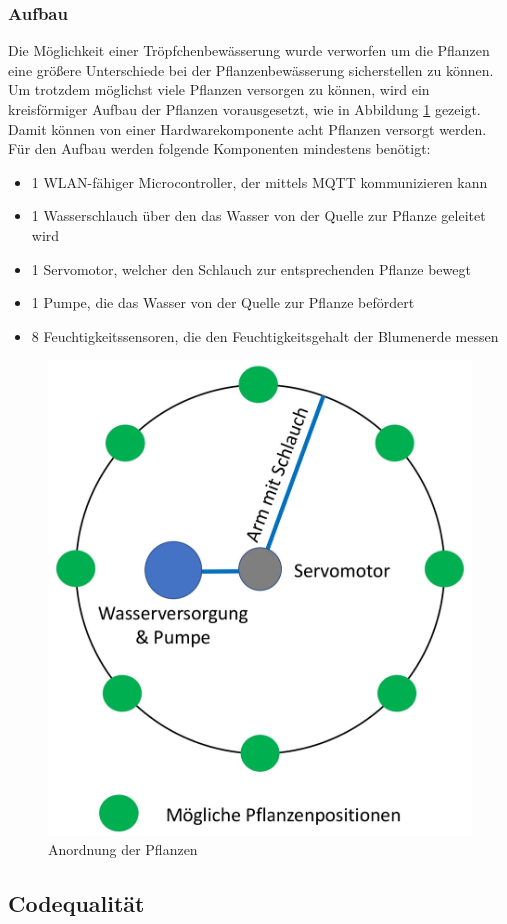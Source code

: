         \subsubsection{Aufbau}
        Die Möglichkeit einer Tröpfchenbewässerung wurde verworfen um die Pflanzen eine größere Unterschiede bei der Pflanzenbewässerung sicherstellen zu können. Um trotzdem möglichst viele Pflanzen versorgen zu können, wird ein kreisförmiger Aufbau der Pflanzen vorausgesetzt, wie in Abbildung \ref{fig:position} gezeigt. Damit können von einer Hardwarekomponente acht Pflanzen versorgt werden. \\
        
        Für den Aufbau werden folgende Komponenten mindestens benötigt:
        \begin{itemize}
            \item 1 WLAN-fähiger Microcontroller, der mittels MQTT kommunizieren kann
            \item 1 Wasserschlauch über den das Wasser von der Quelle zur Pflanze geleitet wird
            \item 1 Servomotor, welcher den Schlauch zur entsprechenden Pflanze bewegt
            \item 1 Pumpe, die das Wasser von der Quelle zur Pflanze befördert
           \item 8 Feuchtigkeitssensoren, die den Feuchtigkeitsgehalt der Blumenerde messen
        \end{itemize}
        \begin{figure}
            \centering
            \includegraphics[width=0.6\linewidth]{Pictures/Konzept/Position}
            \caption{Anordnung der Pflanzen}
            \label{fig:position}
        \end{figure}
        
    \subsection{Codequalität}